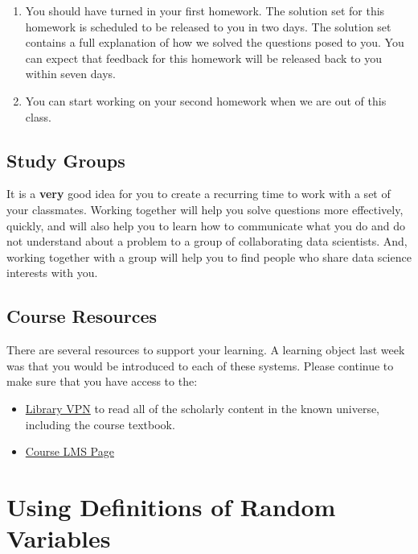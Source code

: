 \documentclass[
]{book}
\providecommand{\tightlist}{%
  \setlength{\itemsep}{0pt}\setlength{\parskip}{0pt}}
\theoremstyle{definition}
\theoremstyle{definition}
\theoremstyle{definition}
\theoremstyle{definition}
\theoremstyle{remark}
\begin{document}
\begin{enumerate}
\def\labelenumi{\arabic{enumi}.}
\tightlist
\item
  You should have turned in your first homework. The solution set for this homework is scheduled to be released to you in two days. The solution set contains a full explanation of how we solved the questions posed to you. You can expect that feedback for this homework will be released back to you within seven days.
\item
  You can start working on your second homework when we are out of this class.
\end{enumerate}

\hypertarget{study-groups}{%
\subsection*{Study Groups}\label{study-groups}}

It is a \textbf{very} good idea for you to create a recurring time to work with a set of your classmates. Working together will help you solve questions more effectively, quickly, and will also help you to learn how to communicate what you do and do not understand about a problem to a group of collaborating data scientists. And, working together with a group will help you to find people who share data science interests with you.

\hypertarget{course-resources}{%
\subsection*{Course Resources}\label{course-resources}}

There are several resources to support your learning. A learning object last week was that you would be introduced to each of these systems. Please continue to make sure that you have access to the:

\begin{itemize}
\tightlist
\item
  \href{https://www.lib.berkeley.edu/using-the-libraries/vpn}{Library VPN} to read all of the scholarly content in the known universe, including the course textbook.
\item
  \href{https://www.bcourses.berkeley.edu}{Course LMS Page}
\end{itemize}

\hypertarget{using-definitions-of-random-variables}{%
\section{Using Definitions of Random Variables}\label{using-definitions-of-random-variables}}
\end{document}
